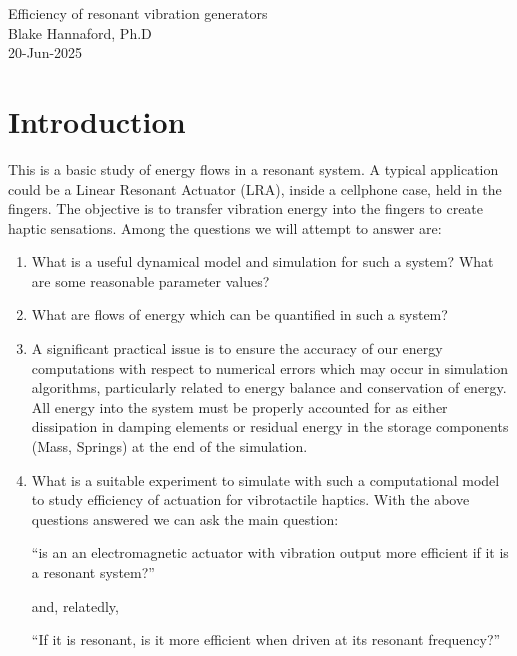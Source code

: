 \documentclass[letterpaper,11pt]{article}
\begin{document}
%
\begin{center}{\Large
Efficiency of resonant vibration generators\\
Blake Hannaford, Ph.D\\}
20-Jun-2025
\end{center}


\begin{figure}[b]\centering

\caption{}\label{3MassSchematic}
\end{figure}

\section*{Introduction}
This is a basic study of energy flows in a resonant system.  A typical application could be a Linear Resonant Actuator (LRA), inside a cellphone case,
held in the fingers.  The objective is to transfer vibration energy into the fingers to create haptic sensations.   Among the questions we will
attempt to answer are:
\begin{enumerate}
    \item  What is a useful dynamical model and simulation for such a system? What are some reasonable parameter values?
    \item  What are flows of energy which can be quantified in such a system?
    \item A significant practical issue is to ensure the accuracy of our energy computations with respect to numerical errors which may
    occur in simulation algorithms, particularly related to energy balance and conservation of energy.    All energy into the system must
    be properly accounted for as either dissipation in damping elements or residual energy in the storage components (Mass, Springs) at the end of the simulation.
    \item  What is a suitable experiment to simulate with such a computational model to study efficiency of
    actuation for vibrotactile haptics.
     With the above questions answered we can ask the main question:

         ``is an an electromagnetic
     actuator with vibration output more efficient if it is a resonant system?''

     and, relatedly,

     ``If it is resonant, is it more efficient when driven at its resonant frequency?''
\end{enumerate}
\end{document}
